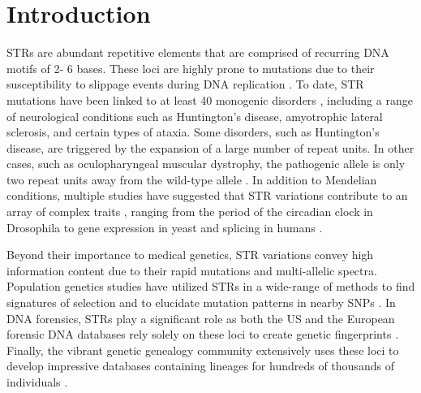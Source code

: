 \section{Introduction}
STRs are abundant repetitive elements that are comprised of recurring DNA motifs of 2- 6 bases. These loci are highly prone to mutations due to their susceptibility to slippage events during DNA replication \cite{Ellegren2004}. To date, STR mutations have been linked to at least 40 monogenic disorders \cite{PearsonNicholEdamuraCleary2005,Mirkin2007}, including a range of neurological conditions such as Huntington's disease, amyotrophic lateral sclerosis, and certain types of ataxia. Some disorders, such as Huntington's disease, are triggered by the expansion of a large number of repeat units. In other cases, such as oculopharyngeal muscular dystrophy, the pathogenic allele is only two repeat units away from the wild-type allele \cite{BraisBouchardXieEtAl1998}. In addition to Mendelian conditions, multiple studies have suggested that STR variations contribute to an array of complex traits \cite{GemayelVincesLegendreEtAl2010}, ranging from the period of the circadian clock in Drosophila \cite{SawyerHennessyPeixotoEtAl1997} to gene expression in yeast \cite{VincesLegendreCaldaraEtAl2009} and splicing in humans \cite{HefferonGromanYurkEtAl2004,SathasivamNeuederGipsonEtAl2013}.

Beyond their importance to medical genetics, STR variations convey high information content due to their rapid mutations and multi-allelic spectra. Population genetics studies have utilized STRs in a wide-range of methods to find signatures of selection and to elucidate mutation patterns in nearby SNPs \cite{TishkoffVarkonyiCahinhinanEtAl2001,SunHelgasonMassonEtAl2012}. In DNA forensics, STRs play a significant role as both the US and the European forensic DNA databases rely solely on these loci to create genetic fingerprints \cite{KayserKnijff2011}. Finally, the vibrant genetic genealogy community extensively uses these loci to develop impressive databases containing lineages for hundreds of thousands of individuals \cite{KhanMittelman2013}.

